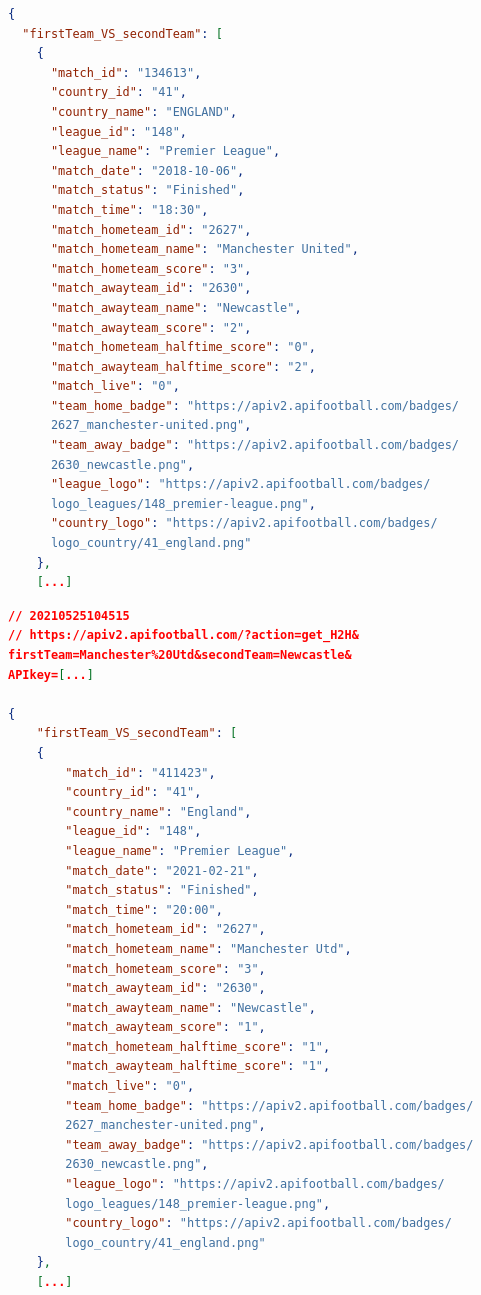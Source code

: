 \documentclass[a4paper,14pt]{extarticle}
\begin{document}
{\begin{lstlisting}[language=json, firstnumber=1, caption=Aperçu du JSON avec "Manchester United", captionpos=b, label=apercuJSON]
{
  "firstTeam_VS_secondTeam": [
    {
      "match_id": "134613",
      "country_id": "41",
      "country_name": "ENGLAND",
      "league_id": "148",
      "league_name": "Premier League",
      "match_date": "2018-10-06",
      "match_status": "Finished",
      "match_time": "18:30",
      "match_hometeam_id": "2627",
      "match_hometeam_name": "Manchester United",
      "match_hometeam_score": "3",
      "match_awayteam_id": "2630",
      "match_awayteam_name": "Newcastle",
      "match_awayteam_score": "2",
      "match_hometeam_halftime_score": "0",
      "match_awayteam_halftime_score": "2",
      "match_live": "0",
      "team_home_badge": "https://apiv2.apifootball.com/badges/
      2627_manchester-united.png",
      "team_away_badge": "https://apiv2.apifootball.com/badges/
      2630_newcastle.png",
      "league_logo": "https://apiv2.apifootball.com/badges/
      logo_leagues/148_premier-league.png",
      "country_logo": "https://apiv2.apifootball.com/badges/
      logo_country/41_england.png"
    },
    [...]
\end{lstlisting}

\begin{lstlisting}[language=json, firstnumber=1, caption=Aperçu du JSON avec "Manchester United", captionpos=b, label=apercuJSON]
// 20210525104515
// https://apiv2.apifootball.com/?action=get_H2H&
firstTeam=Manchester%20Utd&secondTeam=Newcastle&
APIkey=[...]

{
    "firstTeam_VS_secondTeam": [
    {
        "match_id": "411423",
        "country_id": "41",
        "country_name": "England",
        "league_id": "148",
        "league_name": "Premier League",
        "match_date": "2021-02-21",
        "match_status": "Finished",
        "match_time": "20:00",
        "match_hometeam_id": "2627",
        "match_hometeam_name": "Manchester Utd",
        "match_hometeam_score": "3",
        "match_awayteam_id": "2630",
        "match_awayteam_name": "Newcastle",
        "match_awayteam_score": "1",
        "match_hometeam_halftime_score": "1",
        "match_awayteam_halftime_score": "1",
        "match_live": "0",
        "team_home_badge": "https://apiv2.apifootball.com/badges/
        2627_manchester-united.png",
        "team_away_badge": "https://apiv2.apifootball.com/badges/
        2630_newcastle.png",
        "league_logo": "https://apiv2.apifootball.com/badges/
        logo_leagues/148_premier-league.png",
        "country_logo": "https://apiv2.apifootball.com/badges/
        logo_country/41_england.png"
    },
    [...]
\end{lstlisting}

}
\end{document}
